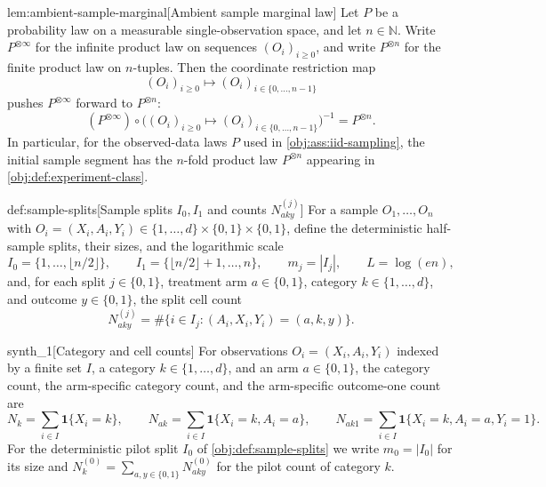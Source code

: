 \begin{lemmav}{lem:ambient-sample-marginal}[Ambient sample marginal law]
Let \(P\) be a probability law on a measurable single-observation space, and let \(n\in\mathbb N\). Write \(P^{\otimes\infty}\) for the infinite product law on sequences \((O_i)_{i\ge 0}\), and write \(P^{\otimes n}\) for the finite product law on \(n\)-tuples. Then the coordinate restriction map
\[
(O_i)_{i\ge 0}\longmapsto (O_i)_{i\in\{0,\ldots,n-1\}}
\]
pushes \(P^{\otimes\infty}\) forward to \(P^{\otimes n}\):
\[
(P^{\otimes\infty})\circ\bigl((O_i)_{i\ge 0}\mapsto (O_i)_{i\in\{0,\ldots,n-1\}}\bigr)^{-1}
=
P^{\otimes n}.
\]
In particular, for the observed-data laws \(P\) used in \cref{obj:ass:iid-sampling}, the initial sample segment has the \(n\)-fold product law \(P^{\otimes n}\) appearing in \cref{obj:def:experiment-class}.
\end{lemmav}

\begin{definitionv}{def:sample-splits}[Sample splits \(I_0,I_1\) and counts \(N^{(j)}_{aky}\)]
For a sample \(O_1,\ldots,O_n\) with \(O_i=(X_i,A_i,Y_i)\in\{1,\ldots,d\}\times\{0,1\}\times\{0,1\}\), define the deterministic half-sample splits, their sizes, and the logarithmic scale
\[
I_0=\{1,\ldots,\lfloor n/2\rfloor\},\qquad I_1=\{\lfloor n/2\rfloor+1,\ldots,n\},\qquad m_j=|I_j|,\qquad L=\log(en),
\]
and, for each split \(j\in\{0,1\}\), treatment arm \(a\in\{0,1\}\), category \(k\in\{1,\ldots,d\}\), and outcome \(y\in\{0,1\}\), the split cell count
\[
N^{(j)}_{aky}=\#\{i\in I_j:(A_i,X_i,Y_i)=(a,k,y)\}.
\]
\end{definitionv}

\begin{definitionv}{synth_1}[Category and cell counts]
For observations \(O_i=(X_i,A_i,Y_i)\) indexed by a finite set \(I\), a category \(k\in\{1,\ldots,d\}\), and an arm \(a\in\{0,1\}\), the category count, the arm-specific category count, and the arm-specific outcome-one count are \[ N_k=\sum_{i\in I}\mathbf 1\{X_i=k\},\qquad N_{ak}=\sum_{i\in I}\mathbf 1\{X_i=k,A_i=a\},\qquad N_{ak1}=\sum_{i\in I}\mathbf 1\{X_i=k,A_i=a,Y_i=1\}. \] For the deterministic pilot split \(I_0\) of \cref{obj:def:sample-splits} we write \(m_0=|I_0|\) for its size and \(N_k^{(0)}=\sum_{a,y\in\{0,1\}}N^{(0)}_{aky}\) for the pilot count of category \(k\).
\end{definitionv}

